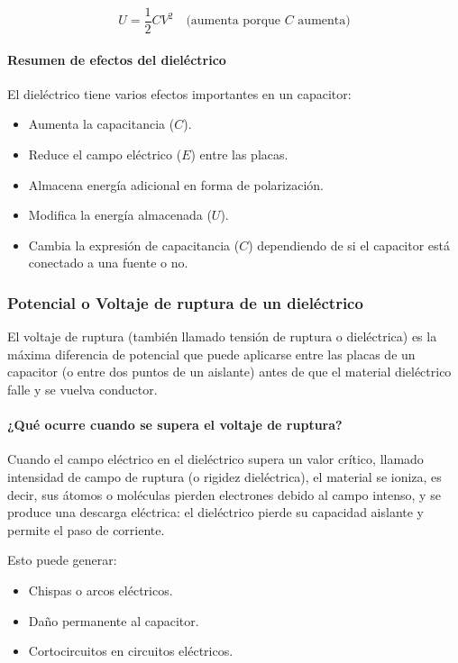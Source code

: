 \[
U = \frac{1}{2} C V^2 \quad \text{(aumenta porque } C \text{ aumenta)}
\]

\paragraph{Resumen de efectos del dieléctrico}

El dieléctrico tiene varios efectos importantes en un capacitor:
\begin{itemize}
    \item Aumenta la capacitancia (\( C \)).
    \item Reduce el campo eléctrico (\( E \)) entre las placas.
    \item Almacena energía adicional en forma de polarización.
    \item Modifica la energía almacenada (\( U \)).
    \item Cambia la expresión de capacitancia (\( C \)) dependiendo de si el capacitor está conectado a una fuente o no.
\end{itemize}

\subsubsection{Potencial o Voltaje de ruptura de un dieléctrico}

El voltaje de ruptura (también llamado tensión de ruptura o dieléctrica) es la máxima diferencia de potencial que puede aplicarse entre las placas de un capacitor (o entre dos puntos de un aislante) antes de que el material dieléctrico falle y se vuelva conductor.

\paragraph{¿Qué ocurre cuando se supera el voltaje de ruptura?}

Cuando el campo eléctrico en el dieléctrico supera un valor crítico, llamado intensidad de campo de ruptura (o rigidez dieléctrica), el material se ioniza, es decir, sus átomos o moléculas pierden electrones debido al campo intenso, y se produce una descarga eléctrica: el dieléctrico pierde su capacidad aislante y permite el paso de corriente.

Esto puede generar:

\begin{itemize}
    \item Chispas o arcos eléctricos.
    \item Daño permanente al capacitor.
    \item Cortocircuitos en circuitos eléctricos.
\end{itemize}

